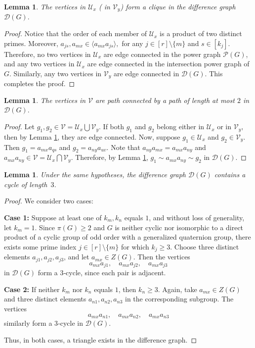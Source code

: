 \documentclass[12pt]{amsart}
\theoremstyle{plain}
\newtheorem{lemma}[theorem]{Lemma}
\theoremstyle{remark}
\theoremstyle{definition}
\begin{document}
\begin{lemma}\label{t:clique}
The vertices in $\mathcal{U}_x$ ( in $\mathcal{V}_y$) form a clique in the difference graph $\mathcal{D}(G).$  
\end{lemma}
\begin{proof}
 Notice that the order of each member of $\mathcal{U}_x$ is a product of two distinct primes. Moreover, $a_{js}, a_{mx}\in \langle a_{mx}a_{js}\rangle,$ for any $j\in [r]\setminus\{m\}$ and $s\in [k_j].$
 Therefore, no two vertices in $\mathcal{U}_x$ are edge connected in the power graph $\mathcal{P}(G)$, and any two vertices in $\mathcal{U}_x$ are edge connected in the intersection power graph of $G.$ Similarly, any two vertices in $\mathcal{V}_y$ are edge connected in $\mathcal{D}(G).$ This completes the proof.    
\end{proof}
\begin{lemma}\label{t:pconn2}
The vertices in $\mathcal{V}$ are path connected by a path of length at most $2$ in $\mathcal{D}(G).$    
\end{lemma}
\begin{proof}
Let $g_1, g_2\in \mathcal{V}=\mathcal{U}_x\bigcup \mathcal{V}_y.$ If both $g_1$ and $g_2$ belong either in $\mathcal{U}_x$ or in $\mathcal{V}_y,$ then by Lemma \ref{t:clique}, they are edge connected. Now, suppose $g_1\in \mathcal{U}_x$ and $g_2\in \mathcal{V}_y.$ Then $g_1 = a_{mx}a_{qs}$ and $g_2 = a_{ny}a_{uv}.$ Note that $a_{ny}a_{mx}=a_{mx}a_{ny}$ and $a_{mx}a_{ny}\in \mathcal{V}=\mathcal{U}_x\bigcap \mathcal{V}_y.$ Therefore, by Lemma \ref{t:clique}, $g_1\sim a_{mx}a_{ny}\sim g_2$ in $\mathcal{D}(G).$  
\end{proof}



\begin{lemma}\label{t:k3}
Under the same hypotheses, the difference graph $\mathcal{D}(G)$ contains a cycle of length~$3$.
\end{lemma}

\begin{proof}
We consider two cases:

\medskip

\textbf{Case 1:} Suppose at least one of $k_m, k_n$ equals $1$, and without loss of generality, let $k_m = 1$. Since $\pi(G) \ge 2$ and $G$ is neither cyclic nor isomorphic to a direct product of a cyclic group of odd order with a generalized quaternion group, there exists some prime index $j \in [r] \setminus \{m\}$ for which $k_j \ge 3$. Choose three distinct elements $a_{j1}, a_{j2}, a_{j3}$, and let $a_{mx} \in Z(G)$. Then the vertices
\[
a_{mx}a_{j1}, \quad a_{mx}a_{j2}, \quad a_{mx}a_{j3}
\]
in $\mathcal{D}(G)$ form a $3$‑cycle, since each pair is adjacent.

\medskip

\textbf{Case 2:} If neither $k_m$ nor $k_n$ equals $1$, then $k_n \ge 3$. Again, take $a_{mx} \in Z(G)$ and three distinct elements $a_{n1}, a_{n2}, a_{n3}$ in the corresponding subgroup. The vertices
\[
a_{mx}a_{n1}, \quad a_{mx}a_{n2}, \quad a_{mx}a_{n3}
\]
similarly form a $3$‑cycle in $\mathcal{D}(G)$.

Thus, in both cases, a triangle exists in the difference graph.
\end{proof}
\end{document}

